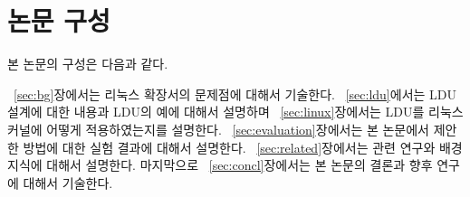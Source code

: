 \newpage
\section{논문 구성} \label{sec:intro}
본 논문의 구성은 다음과 같다.

~\ref{sec:bg}장에서는 리눅스 확장서의 문제점에 대해서 기술한다. 
~\ref{sec:ldu}에서는 LDU 설계에 대한 내용과 LDU의 예에 대해서 설명하며 
~\ref{sec:linux}장에서는 LDU를 리눅스 커널에 어떻게 적용하였는지를 설명한다.
~\ref{sec:evaluation}장에서는 본 논문에서 제안한 방법에 대한 실험 결과에 대해서 설명한다. 
~\ref{sec:related}장에서는 관련 연구와 배경지식에 대해서 설명한다.
마지막으로 ~\ref{sec:concl}장에서는 본 논문의 결론과 향후 연구에 대해서 기술한다. 

